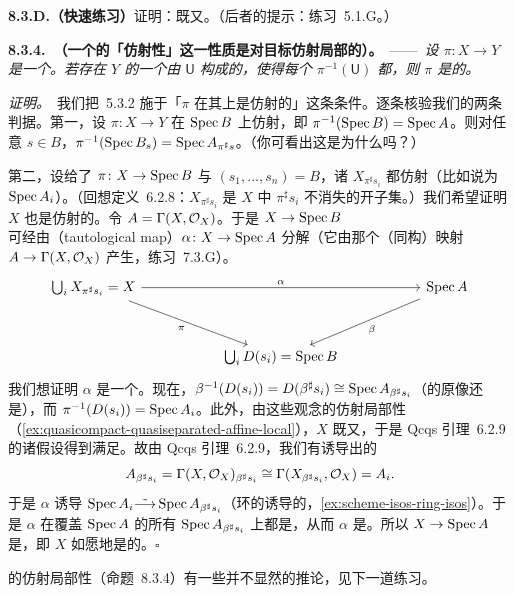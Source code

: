 \textbf{8.3.D.（快速练习）}\quad 证明：\trAffine{}\trMorphism{}既\trQuasicompact{}又\trQuasiSeparated。（后者的提示：练习~5.1.G。）

\textbf{8.3.4.\ \trhProposition{}（一个\trMorphism{}的「仿射性」这一性质是对目标仿射局部的）。}\ ——\ \emph{设 $\pi\colon X\to Y$ 是一个\trMorphism。若存在 $Y$ 的一个由\trAffine\trOpenSet{} $\mathsf{U}$ 构成的\trCover{}，使得每个 $\pi^{-1}(\mathsf{U})$ 都\trAffine，则 $\pi$ 是\trAffine{}的。}

\emph{证明。}\ 我们把\trAffineCommunicationLemma{}~5.3.2 施于「$\pi$ 在其上是仿射的」这条条件。逐条核验我们的两条判据。第一，设 $\pi\colon X\to Y$ 在 $\operatorname{Spec} B$ 上仿射，即 $\pi^{-1}(\operatorname{Spec} B)=\operatorname{Spec} A$。则对任意 $s\in B$，$\pi^{-1}(\operatorname{Spec} B_s)=\operatorname{Spec} A_{\pi^\sharp s}$。（你可看出这是为什么吗？）

第二，设给了 $\pi\colon X\to\operatorname{Spec} B$ 与 $(s_1,\dots,s_n)=B$，诸 $X_{\pi^\sharp s_i}$ 都仿射（比如说为 $\operatorname{Spec} A_i$）。（回想定义~6.2.8：$X_{\pi^\sharp s_i}$ 是 $X$ 中 $\pi^\sharp s_i$ 不消失的开子集。）我们希望证明 $X$ 也是仿射的。令 $A=\Gamma(X,\mathcal{O}_X)$。于是 $X\to\operatorname{Spec} B$ 可经由\trTautologicalMap{}（tautological map）$\alpha\colon X\to\operatorname{Spec} A$ 分解（它由那个（同构）映射 $A\to\Gamma(X,\mathcal{O}_X)$ 产生，练习~7.3.G）。
\[
\begin{tikzcd}[row sep=3.2em, column sep=5.5em]
\bigcup_i X_{\pi^\sharp s_i}=X \ar[dr, "\pi"'] \ar[rr, "\alpha"] & & \Spec A \ar[dl, "\beta"] \\
& \bigcup_i D(s_i)=\Spec B &
\end{tikzcd}
\]
我们想证明 $\alpha$ 是一个\trIsomorphism。现在，$\beta^{-1}(D(s_i))=D(\beta^\sharp s_i)\cong\operatorname{Spec} A_{\beta^\sharp s_i}$（\trDistinguishedOpen{}的原像还是\trDistinguishedOpen），而 $\pi^{-1}(D(s_i))=\operatorname{Spec} A_i$。此外，由这些观念的仿射局部性（\cref{ex:quasicompact-quasiseparated-affine-local}），$X$ 既\trQuasicompact{}又\trQuasiSeparated，于是 Qcqs 引理~6.2.9 的诸假设得到满足。故由 Qcqs 引理~6.2.9，我们有诱导出的\trIsomorphism
\[
A_{\beta^\sharp s_i}=\Gamma(X,\mathcal{O}_X)_{\beta^\sharp s_i}\cong\Gamma(X_{\beta^\sharp s_i},\mathcal{O}_X)=A_i.
\]
于是 $\alpha$ 诱导\trIsomorphism{} $\operatorname{Spec} A_i\tilde{\longrightarrow}\operatorname{Spec} A_{\beta^\sharp s_i}$（环的\trIsomorphism{}诱导\trAffineScheme{}的\trIsomorphism，\cref{ex:scheme-isos-ring-isos}）。于是 $\alpha$ 在覆盖 $\operatorname{Spec} A$ 的所有 $\operatorname{Spec} A_{\beta^\sharp s_i}$ 上都是\trIsomorphism，从而 $\alpha$ 是\trIsomorphism。所以 $X\to\operatorname{Spec} A$ 是\trIsomorphism，即 $X$ 如愿地是\trAffine{}的。\hfill$\square$

\trAffine{}\trMorphism{}的仿射局部性（命题~8.3.4）有一些并不显然的推论，见下一道练习。

